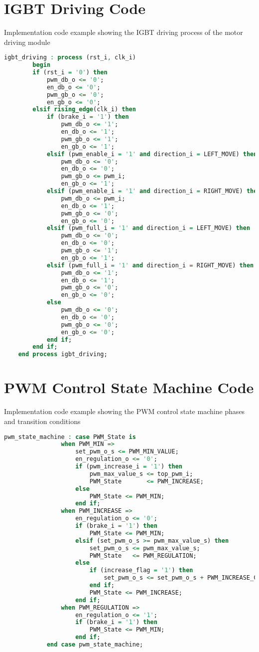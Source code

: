\section{IGBT Driving Code}
\label{igbt-driving-code}
Implementation code example showing the IGBT driving process of the motor driving module
\begin{lstlisting}[language=VHDL]
igbt_driving : process (rst_i, clk_i)
		begin
		if (rst_i = '0') then
			pwm_db_o <= '0';
			en_db_o <= '0';
			pwm_gb_o <= '0';
			en_gb_o <= '0';
		elsif rising_edge(clk_i) then
			if (brake_i = '1') then
				pwm_db_o <= '1'; 
				en_db_o <= '1'; 
				pwm_gb_o <= '1'; 
				en_gb_o <= '1';
			elsif (pwm_enable_i = '1' and direction_i = LEFT_MOVE) then
				pwm_db_o <= '0';
				en_db_o <= '0';	
				pwm_gb_o <= pwm_i;
				en_gb_o <= '1';
			elsif (pwm_enable_i = '1' and direction_i = RIGHT_MOVE) then
				pwm_db_o <= pwm_i;
				en_db_o <= '1';			
				pwm_gb_o <= '0';
				en_gb_o <= '0';	
			elsif (pwm_full_i = '1' and direction_i = LEFT_MOVE) then
				pwm_db_o <= '0';
				en_db_o <= '0';	
				pwm_gb_o <= '1';
				en_gb_o <= '1';
			elsif (pwm_full_i = '1' and direction_i = RIGHT_MOVE) then
				pwm_db_o <= '1';
				en_db_o <= '1';			
				pwm_gb_o <= '0';
				en_gb_o <= '0';		
			else
				pwm_db_o <= '0';
				en_db_o <= '0';			
				pwm_gb_o <= '0';
				en_gb_o <= '0';								
			end if;
		end if;
	end process igbt_driving;
\end{lstlisting}

\section{PWM Control State Machine Code} %
\label{pwm-state-machine-code}
Implementation code example showing the PWM control state machine phases and transition conditions

\begin{lstlisting}[language=VHDL]
pwm_state_machine : case PWM_State is
				when PWM_MIN =>
					set_pwm_o_s <= PWM_MIN_VALUE;
					en_regulation_o <= '0';
					if (pwm_increase_i = '1') then
						pwm_max_value_s <= top_pwm_i;
						PWM_State       <= PWM_INCREASE;
					else
						PWM_State <= PWM_MIN;
					end if;
				when PWM_INCREASE =>
					en_regulation_o <= '0';
					if (brake_i = '1') then
						PWM_State <= PWM_MIN;
					elsif (set_pwm_o_s >= pwm_max_value_s) then
						set_pwm_o_s <= pwm_max_value_s; 
						PWM_State   <= PWM_REGULATION;
					else
						if (increase_flag = '1') then 
							set_pwm_o_s <= set_pwm_o_s + PWM_INCREASE_CONSTANT;
						end if;
						PWM_State <= PWM_INCREASE;
					end if;
				when PWM_REGULATION =>
					en_regulation_o <= '1'; 
					if (brake_i = '1') then
						PWM_State <= PWM_MIN;
					end if;
			end case pwm_state_machine;
\end{lstlisting}


